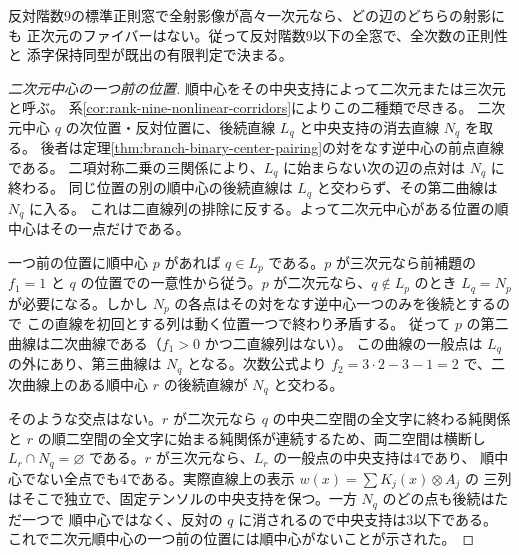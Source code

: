 \begin{theorem}\label{thm:rank-nine-branch-exclusion}
反対階数9の標準正則窓で全射影像が高々一次元なら、どの辺のどちらの射影にも
正次元のファイバーはない。従って反対階数9以下の全窓で、全次数の正則性と
添字保持同型が既出の有限判定で決まる。
\end{theorem}
\begin{proof}[二次元中心の一つ前の位置]
順中心をその中央支持によって二次元または三次元と呼ぶ。
系\ref{cor:rank-nine-nonlinear-corridors}によりこの二種類で尽きる。
二次元中心 $q$ の次位置・反対位置に、後続直線 $L_q$ と中央支持の消去直線 $N_q$ を取る。
後者は定理\ref{thm:branch-binary-center-pairing}の対をなす逆中心の前点直線である。
二項対称二乗の三関係により、$L_q$ に始まらない次の辺の点対は $N_q$ に終わる。
同じ位置の別の順中心の後続直線は $L_q$ と交わらず、その第二曲線は $N_q$ に入る。
これは二直線列の排除に反する。よって二次元中心がある位置の順中心はその一点だけである。

一つ前の位置に順中心 $p$ があれば $q\in L_p$ である。$p$ が三次元なら前補題の
$f_1=1$ と $q$ の位置での一意性から従う。$p$ が二次元なら、$q\notin L_p$ のとき
$L_q=N_p$ が必要になる。しかし $N_p$ の各点はその対をなす逆中心一つのみを後続とするので
この直線を初回とする列は動く位置一つで終わり矛盾する。
従って $p$ の第二曲線は二次曲線である（$f_1>0$ かつ二直線列はない）。
この曲線の一般点は $L_q$ の外にあり、第三曲線は $N_q$ となる。次数公式より
$f_2=3\cdot2-3-1=2$ で、二次曲線上のある順中心 $r$ の後続直線が $N_q$ と交わる。

そのような交点はない。$r$ が二次元なら $q$ の中央二空間の全文字に終わる純関係と
$r$ の順二空間の全文字に始まる純関係が連続するため、両二空間は横断し
$L_r\cap N_q=\varnothing$ である。$r$ が三次元なら、$L_r$ の一般点の中央支持は4であり、
順中心でない全点でも4である。実際直線上の表示 $w(x)=\sum K_j(x)\otimes A_j$ の
三列はそこで独立で、固定テンソルの中央支持を保つ。一方 $N_q$ のどの点も後続はただ一つで
順中心ではなく、反対の $q$ に消されるので中央支持は3以下である。
これで二次元順中心の一つ前の位置には順中心がないことが示された。
\end{proof}

